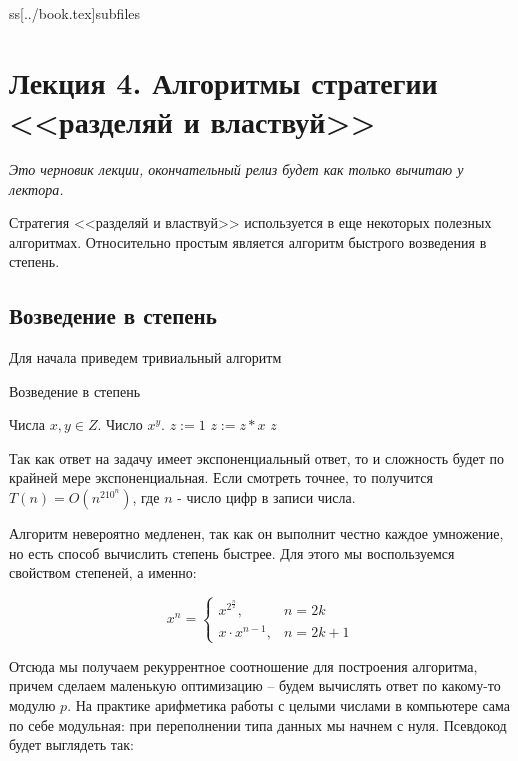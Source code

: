 ss[../book.tex]{subfiles}



	\section{Лекция 4. Алгоритмы стратегии <<разделяй и властвуй>>}
		\textit{Это черновик лекции, окончательный релиз будет как только вычитаю у лектора.}
		
		
		Стратегия <<разделяй и властвуй>> используется в еще некоторых полезных алгоритмах. Относительно простым является алгоритм быстрого возведения в степень.
		
		\subsection{Возведение в степень}
		
		Для начала приведем тривиальный алгоритм
		
		\begin{algorithm}[H]
			\caption{Возведение в степень}
			\begin{algorithmic}[1]
				\Require Числа $x, y \in Z$.
				\Ensure Число $x^y$.
					\State $z := 1$
						\State $z := z * x$
					\EndFor
					\State \Return $z$
				\EndFunction
			\end{algorithmic}
		\end{algorithm}
		
		\begin{time}
			Так как ответ на задачу имеет экспоненциальный ответ, то и сложность будет по крайней мере экспоненциальная. Если смотреть точнее, то получится $T(n) = O(n^210^n)$, где $n$ - число цифр в записи числа.
		\end{time}
		
		Алгоритм невероятно медленен, так как он выполнит честно каждое умножение, но есть способ вычислить степень быстрее. Для этого мы воспользуемся свойством степеней, а именно:
		
		\[
		x^n =
		\begin{cases}
			x^{2^\frac{n}{2}},& n = 2k \\
			x \cdot x^{n - 1},& n = 2k + 1
		\end{cases}
		\]
		
		Отсюда мы получаем рекуррентное соотношение для построения алгоритма, причем сделаем маленькую оптимизацию -- будем вычислять ответ по какому-то модулю $p$. На практике арифметика работы с целыми числами в компьютере сама по себе модульная: при переполнении типа данных мы начнем с нуля. Псевдокод будет выглядеть так:
		
